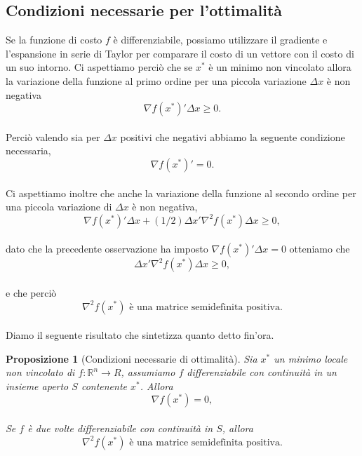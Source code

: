 \documentclass[a4paper, 12pt]{article}
\newtheorem{prop}{Proposizione}
\begin{document}
\subsection{Condizioni necessarie per l'ottimalità}
Se la funzione di costo $f$ è differenziabile, possiamo utilizzare il gradiente e l'espansione in serie di Taylor per comparare il costo di un vettore con il costo di un suo intorno.
Ci aspettiamo perciò che se $x^\ast$ è un minimo non vincolato allora la variazione della funzione al primo ordine per una piccola variazione $\Delta x$ è non negativa\\
\[\nabla f ( x^\ast )' \Delta x \geq 0.\]\\
Perciò valendo sia per $\Delta x$ positivi che negativi abbiamo la seguente condizione necessaria,\\
\[\nabla f ( x^\ast )' = 0. \]\\
Ci aspettiamo inoltre che anche la variazione della funzione al secondo ordine per una piccola variazione di $\Delta x$ è non negativa,\\
\[\nabla f ( x^\ast )' \Delta x + (1/2) \Delta x' \nabla ^2 f (x^\ast) \Delta x\geq 0,\]\\
dato che la precedente osservazione ha imposto $\nabla f (x^\ast)' \Delta x = 0$ otteniamo che\\
\[\Delta x' \nabla ^2 f (x^\ast) \Delta x\geq 0,\]\\
e che perciò\\
\[\nabla ^2 f (x^\ast) \mbox{ è una matrice semidefinita positiva.}\]\\
Diamo il seguente risultato che sintetizza quanto detto fin'ora.
\begin{prop}[Condizioni necessarie di ottimalità]
Sia $x^\ast$ un minimo locale non vincolato di $f:\mathbb{R}^n \to R$, assumiamo $f$ differenziabile con continuità in un insieme aperto $S$ contenente $x^\ast$. Allora\\
\[\nabla f(x^\ast) = 0,\]\\
Se $f$ è due volte differenziabile con continuità in $S$, allora\\
\[\nabla^2 f(x^\ast) \mbox{ è una matrice semidefinita positiva.}\]
\end{prop}
\end{document}
